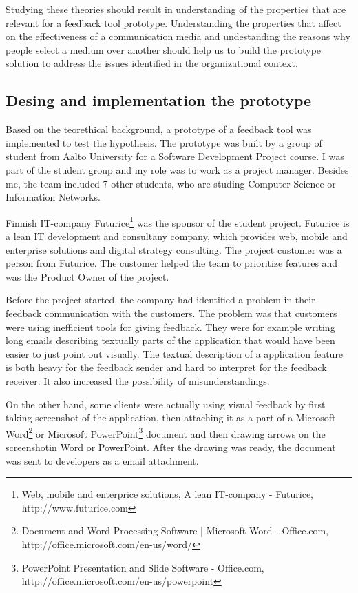 \documentclass[english,12pt,a4paper,pdftex]{article}
\begin{document}
Studying these theories should result in understanding of the properties that are relevant for a feedback tool prototype. Understanding the properties that affect on the effectiveness of a communication media and undestanding the reasons why people select a medium over another should help us to build the prototype solution to address the issues identified in the organizational context.

\subsection{Desing and implementation the prototype}

Based on the teorethical background, a prototype of a feedback tool was implemented to test the hypothesis. The prototype was built by a group of student from Aalto University for a Software Development Project course. I was part of the student group and my role was to work as a project manager. Besides me, the team included 7 other students, who are studing Computer Science or Information Networks.

Finnish IT-company Futurice\footnote{Web, mobile and enterprice solutions, A lean IT-company - Futurice, http://www.futurice.com} was the sponsor of the student project. Futurice is a lean IT development and consultany company, which provides web, mobile and enterprise solutions and digital strategy consulting. The project customer was a person from Futurice. The customer helped the team to prioritize features and was the Product Owner of the project. 

Before the project started, the company had identified a problem in their feedback communication with the customers. The problem was that customers were using inefficient tools for giving feedback. They were for example writing long emails describing textually parts of the application that would have been easier to just point out visually. The textual description of a application feature is both heavy for the feedback sender and hard to interpret for the feedback receiver. It also increased the possibility of misunderstandings.

On the other hand, some clients were actually using visual feedback by first taking screenshot of the application, then attaching it as a part of a Microsoft Word\footnote{Document and Word Processing Software | Microsoft Word - Office.com, http://office.microsoft.com/en-us/word/} or Microsoft PowerPoint\footnote{PowerPoint Presentation and Slide Software - Office.com, http://office.microsoft.com/en-us/powerpoint} document and then drawing arrows on the screenshotin Word or PowerPoint. After the drawing was ready, the document was sent to developers as a email attachment. 
\end{document}
